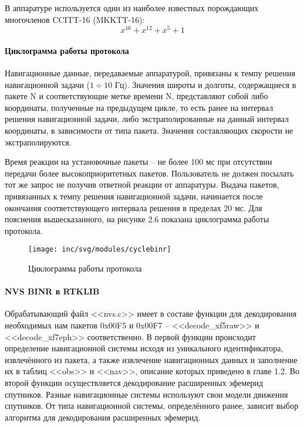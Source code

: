 В аппаратуре используется один из наиболее известных порождающих многочленов
CCITT-16 (MKKTT-16):
\begin{equation}
	x^{16}+x^{12}+x^{5}+1
\end{equation}

\paragraph{Циклограмма работы протокола}

Навигационные данные, передаваемые аппаратурой, привязаны к темпу решения
навигационной задачи ($1 \div 10$ Гц). Значения широты и долготы, содержащиеся в пакете N
и соответствующие метке времени N, представляют собой либо координаты, полученные
на предыдущем цикле, то есть ранее на интервал решения навигационной задачи, либо
экстраполированные на данный интервал координаты, в зависимости от типа пакета.
Значения составляющих скорости не экстраполируются.

Время реакции на установочные пакеты – не более 100 мс при отсутствии передачи
более высокоприоритетных пакетов. Пользователь не должен посылать тот же запрос не
получив ответной реакции от аппаратуры. Выдача пакетов, привязанных к темпу решения
навигационной задачи, начинается после окончания соответствующего интервала
решения в пределах 20 мс. Для пояснения вышесказанного, на рисунке 2.6 показана циклограмма работы протокола\cite{nvsbinrspec}.
\begin{figure}[ht]
	\centering
	\texttt{[image: inc/svg/modules/cyclebinr]}
	\caption{Циклограмма работы протокола}
	\label{fig:cyclebinr}
\end{figure}
\newpage
\paragraph{NVS BINR в RTKLIB}

Обрабатывающий файл <<nvs.c>> имеет в составе функции для  декодирования необходимых нам пакетов 0x00F5 и 0x00F7 -- <<decode\_xf5raw>> и <<decode\_xf7eph>> соответственно. В первой функции происходит определение навигационной системы исходя из уникального идентификатора, извлечённого из пакета, а также извлечение навигационных данных и заполнение их в таблиц <<obs>> и <<nav>>, описание которых приведено в главе 1.2. Во второй функции осуществляется декодирование расширенных эфемерид спутников. Разные навигационные системы используют свои модели движения спутников. От типа навигационной системы, определённого ранее, зависит выбор алгоритма для декодирования расширенных эфемерид.


